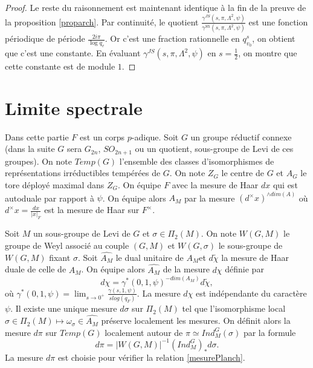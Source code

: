 \documentclass{amsart}
\begin{document}
\begin{proof}
 Le reste du raisonnement est maintenant identique à la fin de la preuve de la proposition \ref{proparch}. Par continuité, le quotient $\frac{\gamma^{JS}(s, \pi, \Lambda^2, \psi)}{\gamma^{Sh}(s, \pi, \Lambda^2, \psi)}$ est une fonction périodique de période $\frac{2i\pi}{\log q_v}$. Or c'est une fraction rationnelle en $q_{v_0}^s$, on obtient que c'est une constante. En évaluant $\gamma^{JS}(s, \pi, \Lambda^2, \psi)$ en $s=\frac{1}{2}$, on montre que cette constante est de module $1$.
 \end{proof}
 
 
 
 \section{Limite spectrale}
 
 Dans cette partie $F$ est un corps $p$-adique. Soit $G$ un groupe réductif connexe (dans la suite $G$ sera $G_{2n}$, $SO_{2n+1}$ ou un quotient, sous-groupe de Levi de ces groupes). On note $Temp(G)$ l'ensemble des classes d'isomorphismes de représentations irréductibles tempérées de $G$. On note $Z_G$ le centre de $G$ et $A_G$ le tore déployé maximal dans $Z_G$. On équipe $F$ avec la mesure de Haar $dx$ qui est autoduale par rapport à $\psi$. On équipe alors $A_M$ par la mesure $(d^\times x)^{\wedge dim(A)}$ où $d^\times x = \frac{dx}{|x|_F}$ est la mesure de Haar sur $F^\times$.

Soit $M$ un sous-groupe de Levi de $G$ et $\sigma \in \Pi_2(M)$. On note $W(G, M)$ le groupe de Weyl associé au couple $(G,M)$ et $W(G, \sigma)$ le sous-groupe de $W(G, M)$ fixant $\sigma$. Soit $\widehat{A_M}$ le dual unitaire de $A_M$et $d\widetilde{\chi}$ la mesure de Haar duale de celle de $A_M$. On équipe alors $\widehat{A_M}$ de la mesure $d\chi$ définie par
\begin{equation}
d\chi = \gamma^*(0, 1, \psi)^{-dim(A_M)}d\widetilde{\chi},
\end{equation}
où $\gamma^*(0, 1, \psi) = \lim_{s \rightarrow 0^+} \frac{\gamma(s, 1, \psi)}{s log(q_F)}$. La mesure $d\chi$ est indépendante du caractère $\psi$. Il existe une unique mesure $d\sigma$ sur $\Pi_2(M)$ tel que l'isomorphisme local $\sigma \in \Pi_2(M) \mapsto \omega_{\sigma} \in \widehat{A_M}$ préserve localement les mesures. On définit alors la mesure $d\pi$ sur $Temp(G)$ localement autour de $\pi \simeq Ind_M^G(\sigma)$ par la formule
\begin{equation}
d\pi  = |W(G, M)|^{-1} (Ind_M^G)_* d\sigma.
\end{equation}
La mesure $d\pi$ est choisie pour vérifier la relation \ref{mesurePlanch}.
\end{document}
